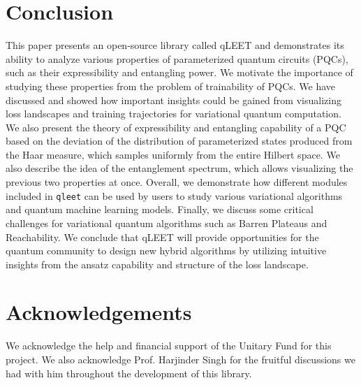 \documentclass[%
 reprint,
 amsmath,
 amssymb,
 showkeys,
 pra,
 floatfix,
]{revtex4-2}
\begin{document}
\section{\label{sec:conclusion}Conclusion}

This paper presents an open-source library called qLEET and demonstrates its ability to analyze various properties of parameterized quantum circuits (PQCs), such as their expressibility and entangling power. We motivate the importance of studying these properties from the problem of trainability of PQCs. We have discussed and showed how important insights could be gained from visualizing loss landscapes and training trajectories for variational quantum computation. We also present the theory of expressibility and entangling capability of a PQC based on the deviation of the distribution of parameterized states produced from the Haar measure, which samples uniformly from the entire Hilbert space. We also describe the idea of the entanglement spectrum, which allows visualizing the previous two properties at once. Overall, we demonstrate how different modules included in \texttt{qleet} can be used by users to study various variational algorithms and quantum machine learning models. Finally, we discuss some critical challenges for variational quantum algorithms such as Barren Plateaus and Reachability. We conclude that qLEET will provide opportunities for the quantum community to design new hybrid algorithms by utilizing intuitive insights from the ansatz capability and structure of the loss landscape.

\section*{Acknowledgements}
We acknowledge the help and financial support of the Unitary Fund for this project. We also acknowledge Prof. Harjinder Singh for the fruitful discussions we had with him throughout the development of this library.



%


\end{document}
